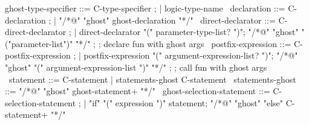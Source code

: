 \begin{syntax}

  ghost-type-specifier ::= C-type-specifier ;
  | {logic-type-name} \
  declaration ::= C-declaration ;
  | "/*@" "ghost" ghost-declaration "*/" \
  direct-declarator ::= C-direct-declarator ;
    | direct-declarator "(" parameter-type-list? ")";
        {"/*@" "ghost" "("parameter-list")" "*/"} ;
        ; declare fun with ghost args
        \
  postfix-expression ::= C-postfix-expression ;
    | postfix-expression "(" argument-expression-list? ")";
    {"/*@" "ghost" "(" argument-expression-list ")" "*/"} ;
    ; call fun with ghost args
    \
  statement ::= C-statement | statements-ghost C-statement \
  statements-ghost ::= "/*@" "ghost" ghost-statement+ "*/" \
  ghost-selection-statement ::= C-selection-statement ;
    | "if" "(" expression ")" statement;
      {"/*@" "ghost" "else" C-statement+ "*/"} \

\end{syntax}

